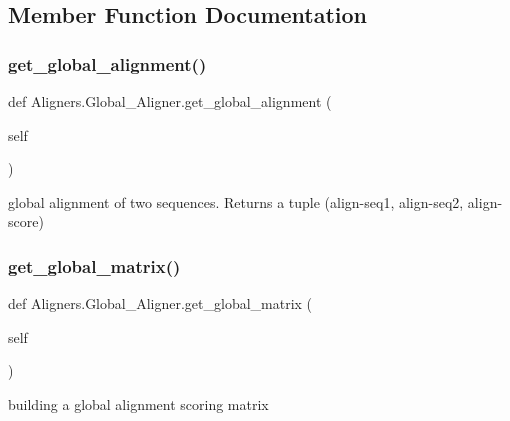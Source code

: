 \subsection{Member Function Documentation}
\mbox{\label{class_aligners_1_1_global___aligner_ae7b1909e0e0262127f767691b20b82e0}} 
\subsubsection{\texorpdfstring{get\+\_\+global\+\_\+alignment()}{get\_global\_alignment()}}
{\footnotesize\ttfamily def Aligners.\+Global\+\_\+\+Aligner.\+get\+\_\+global\+\_\+alignment (\begin{DoxyParamCaption}\item[{}]{self }\end{DoxyParamCaption})}

\begin{DoxyVerb}global alignment of two sequences. Returns a tuple
(align-seq1, align-seq2, align-score)
\end{DoxyVerb}
 \mbox{\label{class_aligners_1_1_global___aligner_ae3a7749813381c746e7d3245efbfd0de}} 
\subsubsection{\texorpdfstring{get\+\_\+global\+\_\+matrix()}{get\_global\_matrix()}}
{\footnotesize\ttfamily def Aligners.\+Global\+\_\+\+Aligner.\+get\+\_\+global\+\_\+matrix (\begin{DoxyParamCaption}\item[{}]{self }\end{DoxyParamCaption})}

\begin{DoxyVerb}building a global alignment scoring matrix\end{DoxyVerb}
 


